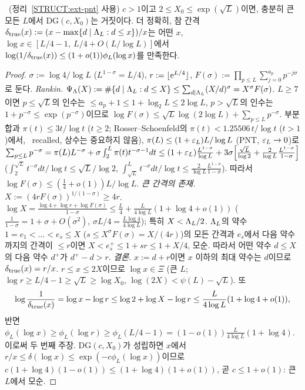 \begin{proposition}\label{STRUCT:prop-DG-sharp}
\REFUTED\ (정리~\ref{STRUCT:ext-pnt} 사용) $c>1$이고 $2\le X_0\le\exp(\sqrt L)$이면, 충분히 큰 모든 $L$에서 $\mathrm{DG}(c,X_0)$는 거짓이다. 더 정확히, 참 간격 $\delta_{\rm true}(x):=(x-\max\{d\mid\Lambda_L:d\le x\})/x$는 어떤 $x$, $\log x\in[L/4-1,\ L/4+O(L/\log L)]$에서 $\log(1/\delta_{\rm true}(x))\le(1+o(1))\phi_L(\log x)$를 만족한다.
\end{proposition}
\begin{proof}
$\sigma:=\log4/\log L$ ($L^{1-\sigma}=L/4$), $r:=\lfloor\mathrm{e}^{L/4}\rfloor$, $F(\sigma):=\prod_{p\le L}\sum_{j=0}^{a_p}p^{-j\sigma}$로 둔다.
\emph{Rankin.} $\Psi_\Lambda(X):=\#\{d\mid\Lambda_L:d\le X\}\le\sum_{d\mid\Lambda_L}(X/d)^\sigma=X^\sigma F(\sigma)$. $L\ge7$이면 $p\le\sqrt L$의 인수는 $\le a_p+1\le1+\log_2L\le2\log L$, $p>\sqrt L$의 인수는 $1+p^{-\sigma}\le\exp(p^{-\sigma})$이므로 $\log F(\sigma)\le\sqrt L\log(2\log L)+\sum_{p\le L}p^{-\sigma}$. 부분합과 $\pi(t)\le3t/\log t$ ($t\ge2$; Rosser--Schoenfeld의 $\pi(t)<1.25506\,t/\log t$ ($t>1$)에서, \EXT\ recalled, 상수는 중요하지 않음), $\pi(L)\le(1+\varepsilon_L)L/\log L$ (PNT, $\varepsilon_L\to0$)로
$\sum_{p\le L}p^{-\sigma}=\pi(L)L^{-\sigma}+\sigma\int_2^L\pi(t)t^{-\sigma-1}dt\le(1+\varepsilon_L)\frac{L^{1-\sigma}}{\log L}+3\sigma\Bigl[\frac{\sqrt L}{\log2}+\frac{2}{\log L}\frac{L^{1-\sigma}}{1-\sigma}\Bigr]$
($\int_2^{\sqrt L}t^{-\sigma}dt/\log t\le\sqrt L/\log 2$, $\int_{\sqrt L}^L t^{-\sigma}dt/\log t\le\frac{2}{\log L}\frac{L^{1-\sigma}}{1-\sigma}$). 따라서 $\log F(\sigma)\le(\frac14+o(1))L/\log L$.
\emph{큰 간격의 존재.} $X:=(4rF(\sigma))^{1/(1-\sigma)}\ge4r$. $\log X=\frac{\log4+\log r+\log F(\sigma)}{1-\sigma}\le\frac L4+\frac{L}{4\log L}(1+\log4+o(1))$ ($\frac1{1-\sigma}=1+\sigma+O(\sigma^2)$, $\sigma L/4=\frac{L\log4}{4\log L}$); 특히 $X<\Lambda_L/2$. $\Lambda_L$의 약수 $1=e_1<\dots<e_s\le X$ ($s\le X^\sigma F(\sigma)=X/(4r)$)의 모든 간격과 $e_s$에서 다음 약수까지의 간격이 $\le r$이면 $X<e_s^+\le1+sr\le1+X/4$, 모순. 따라서 어떤 약수 $d\le X$의 다음 약수 $d^+$가 $d^+-d>r$.
\emph{결론.} $x:=d+r$이면 $x$ 이하의 최대 약수는 $d$이므로 $\delta_{\rm true}(x)=r/x$. $r\le x\le2X$이므로 $\log x\in\Xi$ (큰 $L$; $\log r\ge L/4-1\ge\sqrt L\ge\log X_0$, $\log(2X)<\psi(L)-\sqrt L$). 또
\[
\log\frac1{\delta_{\rm true}(x)}=\log x-\log r\le\log2+\log X-\log r\le\frac{L}{4\log L}(1+\log4+o(1)),
\]
반면 $\phi_L(\log x)\ge\phi_L(\log r)\ge\phi_L(L/4-1)=(1-o(1))\frac{L}{4\log L}(1+\log4)$. 이로써 두 번째 주장. $\mathrm{DG}(c,X_0)$가 성립하면 $x$에서 $r/x\le\delta(\log x)\le\exp(-c\phi_L(\log x))$이므로 $c(1+\log4)(1-o(1))\le(1+\log4)(1+o(1))$, 곧 $c\le1+o(1)$: 큰 $L$에서 모순.
\end{proof}

